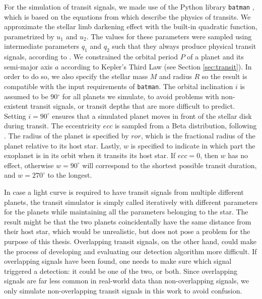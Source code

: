 For the simulation of transit signals, we made use of the Python library \texttt{batman} \citep{kreidberg2015batman}, which is based on the equations from \cite{mandel2002analytic} which describe the physics of transits. We approximate the stellar limb darkening effect with the built-in quadratic function, parametrized by $u_1$ and $u_2$. The values for these parameters were sampled using intermediate parameters $q_1$ and $q_2$ such that they always produce physical transit signals, according to \cite{kipping2013efficient}. We constrained the orbital period $P$ of a planet and its semi-major axis $a$ according to Kepler's Third Law (see Section \ref{sec:transit}). In order to do so, we also specify the stellar mass $M$ and radius $R$ so the result is compatible with the input requirements of \texttt{batman}. The orbital inclination $i$ is assumed to be 90$^\circ$ for all planets we simulate, to avoid problems with non-existent transit signals, or transit depths that are more difficult to predict. Setting $i=90^\circ$ ensures that a simulated planet moves in front of the stellar disk during transit. The eccentricity $ecc$ is sampled from a Beta distribution, following \cite{kipping2013parametrizing}. The radius of the planet is specified by $ror$, which is the fractional radius of the planet relative to its host star. Lastly, $w$ is specified to indicate in which part the exoplanet is in its orbit when it transits its host star. If $ecc=0$, then $w$ has no effect, otherwise $w=90^\circ$ will correspond to the shortest possible transit duration, and $w=270^\circ$ to the longest.

In case a light curve is required to have transit signals from multiple different planets, the transit simulator is simply called iteratively with different parameters for the planets while maintaining all the parameters belonging to the star. The result might be that the two planets coincidentally have the same distance from their host star, which would be unrealistic, but does not pose a problem for the purpose of this thesis. Overlapping transit signals, on the other hand, could make the process of developing and evaluating our detection algorithm more difficult. If overlapping signals have been found, one needs to make sure which signal triggered a detection: it could be one of the two, or both. Since overlapping signals are far less common in real-world data than non-overlapping signals, we only simulate non-overlapping transit signals in this work to avoid confusion.


